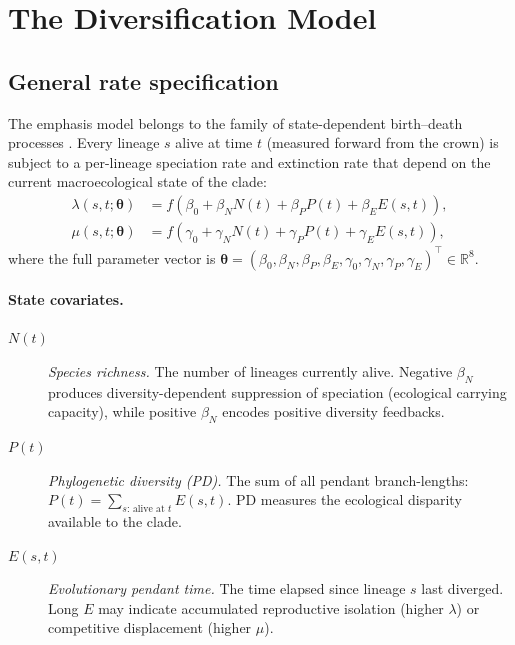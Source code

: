 \documentclass[12pt,a4paper]{article}
\newcommand{\pars}{\bm{\theta}}
\newcommand{\R}{\mathbb{R}}
\begin{document}
\section{The Diversification Model}\label{sec:model}

\subsection{General rate specification}

The \textsf{emphasis} model belongs to the family of state-dependent
birth--death processes \citep{etienne2012prolonged,janzen2015diversity}.
Every lineage $s$ alive at time $t$ (measured forward from the crown) is
subject to a per-lineage speciation rate and extinction rate that depend on
the current macroecological state of the clade:
\begin{align}\label{eq:rates}
  \lambda(s,t;\pars) &= f\!\left(\beta_0 + \beta_N N(t)
                         + \beta_P P(t) + \beta_E E(s,t)\right), \nonumber\\
  \mu(s,t;\pars)     &= f\!\left(\gamma_0 + \gamma_N N(t)
                         + \gamma_P P(t) + \gamma_E E(s,t)\right),
\end{align}
where the full parameter vector is
$\pars = (\beta_0, \beta_N, \beta_P, \beta_E,
          \gamma_0, \gamma_N, \gamma_P, \gamma_E)^\top \in \R^8$.

\paragraph{State covariates.}
\begin{description}
  \item[$N(t)$] \emph{Species richness.} The number of lineages currently
    alive. Negative $\beta_N$ produces diversity-dependent suppression of
    speciation (ecological carrying capacity), while positive $\beta_N$
    encodes positive diversity feedbacks.
  \item[$P(t)$] \emph{Phylogenetic diversity (PD).} The sum of all pendant
    branch-lengths:
    $P(t) = \sum_{s:\,\text{alive at }t} E(s,t)$.
    PD measures the ecological disparity available to the clade.
  \item[$E(s,t)$] \emph{Evolutionary pendant time.} The time elapsed since
    lineage $s$ last diverged. Long $E$ may indicate accumulated reproductive
    isolation (higher $\lambda$) or competitive displacement (higher $\mu$).
\end{description}
\end{document}
